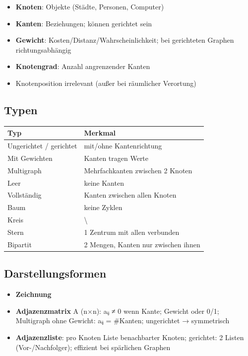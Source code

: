 \documentclass[11pt, a4paper]{article}
\begin{document}
\begin{itemize}
  \item \textbf{Knoten}: Objekte (Städte, Personen, Computer)
  \item \textbf{Kanten}: Beziehungen; können gerichtet sein
  \item \textbf{Gewicht}: Kosten/Distanz/Wahrscheinlichkeit; bei gerichteten Graphen richtungsabhängig
  \item \textbf{Knotengrad}: Anzahl angrenzender Kanten
  \item Knotenposition irrelevant (außer bei räumlicher Verortung)
\end{itemize}


\subsection{Typen}


{\small
\begin{tabularx}{\linewidth}{XX}
\hline
\rowcolor{tableheadbg}
{\color{white}\textbf{Typ}} & {\color{white}\textbf{Merkmal}} \\[2pt]
\hline
\endhead
\hline
\endfoot
Ungerichtet / gerichtet & mit/ohne Kantenrichtung \\
Mit Gewichten & Kanten tragen Werte \\
Multigraph & Mehrfachkanten zwischen 2 Knoten \\
Leer & keine Kanten \\
Vollständig & Kanten zwischen allen Knoten \\
Baum & keine Zyklen \\
Kreis & \textbackslash{} \\
Stern & 1 Zentrum mit allen verbunden \\
Bipartit & 2 Mengen, Kanten nur zwischen ihnen \\
\end{tabularx}
}



\subsection{Darstellungsformen}

\begin{itemize}
  \item \textbf{Zeichnung}
  \item \textbf{Adjazenzmatrix} A (n×n): aᵢⱼ ≠ 0 wenn Kante; Gewicht oder 0/1; Multigraph ohne Gewicht: aᵢⱼ = \#Kanten; ungerichtet → symmetrisch
  \item \textbf{Adjazenzliste}: pro Knoten Liste benachbarter Knoten; gerichtet: 2 Listen (Vor-/Nachfolger); effizient bei spärlichen Graphen
\end{itemize}
\end{document}
